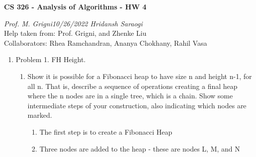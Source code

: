 \documentclass[11pt]{article}
\begin{document}
\begin{center}
    \textbf{CS 326 - Analysis of Algorithms - HW 4}\\
\end{center}


\begin{flushleft}
    \textit{Prof. M. Grigni\hfill10/26/2022 \hfill Hridansh Saraogi} \\
    \vspace{0.15cm}
    \small {Help taken from: Prof. Grigni, and Zhenke Liu}\\
    \small {Collaborators: Rhea Ramchandran, Ananya Chokhany, Rahil Vasa}
\end{flushleft}


\begin{enumerate}

\item Problem 1. FH Height.
    \begin{enumerate}
        \item Show it is possible for a Fibonacci heap to have size n and height n-1, for all n. That is, describe a sequence of operations creating a final heap where the n nodes are in a single tree, which is a chain. Show some intermediate steps of your construction, also indicating which nodes are marked.
        \begin{enumerate}
            \item The first step is to create a Fibonacci Heap 
            \item Three nodes are added to the heap - these are nodes L, M, and N\\

\end{enumerate}
\end{enumerate}
\end{enumerate}
\end{document}
